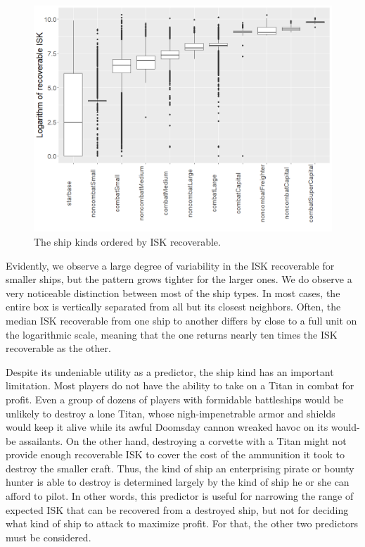 \documentclass[letterpaper,12pt,article]{memoir}
\begin{document}
\begin{figure}[ht]
    \centering
    \includegraphics[width=4.5in]{Boxplot_ShipKind.png}
    \caption{The ship kinds ordered by ISK recoverable.}
    \label{fig:shipkinds}
\end{figure}

Evidently, we observe a large degree of variability in the ISK recoverable for 
smaller ships, but the pattern grows tighter for the larger ones. We do observe
a very noticeable distinction between most of the ship types. In most cases, the 
entire box is vertically separated from all but its closest neighbors. Often, the
median ISK recoverable from one ship to another differs by close to a full unit
on the logarithmic scale, meaning that the one returns nearly ten times the ISK
recoverable as the other.

Despite its undeniable utility as a predictor, the ship kind has an important
limitation. Most players do not have the ability to take on a Titan in combat
for profit. Even a group of dozens of players with formidable battleships would be
unlikely to destroy a lone Titan, whose nigh-impenetrable armor and shields would
keep it alive while its awful Doomsday cannon wreaked havoc on its would-be
assailants. On the other hand, destroying a corvette with a Titan might not
provide enough recoverable ISK to cover the cost of the ammunition it took to
destroy the smaller craft. Thus, the kind of ship an enterprising pirate or bounty
hunter is able to destroy is determined largely by the kind of ship he or she can
afford to pilot. In other words, this predictor is useful for narrowing the range
of expected ISK that can be recovered from a destroyed ship, but not for deciding
what kind of ship to attack to maximize profit. For that, the other two predictors
must be considered.
\end{document}
